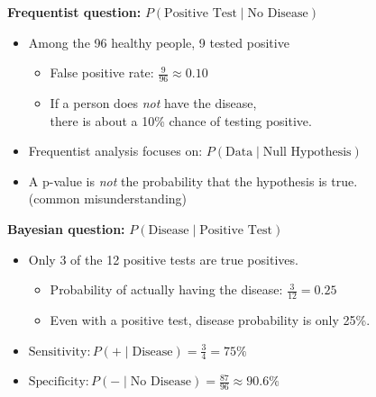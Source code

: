 \documentclass[12pt]{beamer}
\newcommand{\vocab}[1]{\textcolor{AggieMaroon}{\textbf{#1}}}
\begin{document}
\begin{frame}{}
\vocab{Frequentist question:} $P(\text{Positive Test} \mid \text{No Disease})$
\begin{itemize}
    \item Among the 96 healthy people, 9 tested positive
    \begin{itemize}
        \item False positive rate: $\frac{9}{96} \approx 0.10$
        \item[] If a person does \emph{not} have the disease,\\there is about a 10\% chance of testing positive.
    \end{itemize}
    \item Frequentist analysis focuses on: $P(\text{Data} \mid \text{Null Hypothesis})$
    \item A p-value is \emph{not} the probability that the hypothesis is true.\\ (common misunderstanding)
\end{itemize}

\vspace{.2cm}

\vocab{Bayesian question:} $P(\text{Disease} \mid \text{Positive Test})$
\begin{itemize}
    \item Only 3 of the 12 positive tests are true positives.
    \begin{itemize}
        \item Probability of actually having the disease: $\frac{3}{12} = 0.25$
        \item[] Even with a positive test, disease probability is only 25\%.
	\end{itemize}
    \item $\text{Sensitivity}: P(+ \mid \text{Disease}) = \frac{3}{4} = 75\%$
	\item $\text{Specificity}: P(- \mid \text{No Disease}) = \frac{87}{96} \approx 90.6\%$
\end{itemize}

\end{frame}
\end{document}
